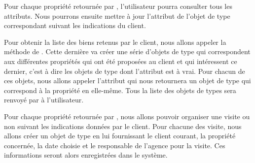 Pour chaque propriété retournée par , l'utilisateur pourra consulter tous les attributs. Nous pourrons ensuite mettre à jour l'attribut  de l'objet de type  correspondant suivant les indications du client.

Pour obtenir la liste des biens retenus par le client, nous allons appeler la méthode  de . Cette dernière va créer une série d'objets de type  qui correspondent aux différentes propriétés qui ont été proposées au client et qui intéressent ce dernier, c'est à dire les objets de type  dont l'attribut  est à vrai. Pour chacun de ces objets, nous allons appeler l'attribut  qui nous retournera un objet de type  qui correspond à la propriété en elle-même. Tous la liste des objets de types  sera renvoyé par  à l'utilisateur.

Pour chaque propriété retournée par , nous allons pouvoir organiser une visite ou non suivant les indications données par le client. Pour chacune des visite, nous allons créer un objet de type  en lui fournissant le client courant, la propriété concernée, la date choisie et le responsable de l'agence pour la visite. Ces informations seront alors enregistrées dans le système.